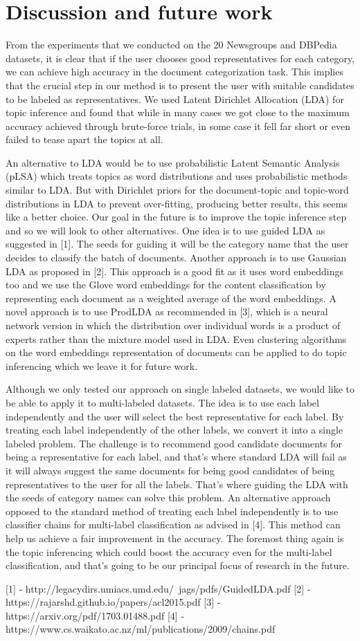 \section{Discussion and future work}
From the experiments that we conducted on the 20 Newsgroups and DBPedia datasets, it is clear that if the user chooses good representatives for each category, we can achieve high accuracy in the document categorization task. This implies that the crucial step in our method is to present the user with suitable candidates to be labeled as representatives.  We used Latent Dirichlet Allocation (LDA) for topic inference and found that while in many cases we got close to the maximum accuracy achieved through brute-force trials, in some case it fell far short or even failed to tease apart the topics at all.

An alternative to LDA would be to use probabilistic Latent Semantic Analysis (pLSA) which treats topics as word distributions and uses probabilistic methods similar to LDA. But with Dirichlet priors for the document-topic and topic-word distributions in LDA to prevent over-fitting, producing better results, this seems like a better choice. Our goal in the future is to improve the topic inference step and so we will look to other alternatives. One idea is to use guided LDA as suggested in [1].  The seeds for guiding it will be the category name that the user decides to classify the batch of documents.  Another approach is to use Gaussian LDA as proposed in [2].  This approach is a good fit as it uses word embeddings too and we use the Glove word embeddings for the content classification by representing each document as a weighted average of the word embeddings.  A novel approach is to use ProdLDA as recommended in [3], which is a neural network version in which the distribution over individual words is a product of experts rather than the mixture model used in LDA.  Even clustering algorithms on the word embeddings representation of documents can be applied to do topic inferencing which we leave it for future work.

Although we only tested our approach on single labeled datasets, we would like to be able to apply it to multi-labeled datasets. The idea is to use each label independently and the user will select the best representative for each label. By treating each label independently of the other labels, we convert it into a single labeled problem. The challenge is to recommend good candidate documents for being a representative for each label, and that's where standard LDA will fail as it will always suggest the same documents for being good candidates of being representatives to the user for all the labels.  That's where guiding the LDA with the seeds of category names can solve this problem.  An alternative approach opposed to the standard method of treating each label independently is to use classifier chains for multi-label classification as advised in [4].  This method can help us achieve a fair improvement in the accuracy.  The foremost thing again is the topic inferencing which could boost the accuracy even for the multi-label classification, and that's going to be our principal focus of research in the future.

[1] - http://legacydirs.umiacs.umd.edu/~jags/pdfs/GuidedLDA.pdf
[2] - https://rajarshd.github.io/papers/acl2015.pdf
[3] - https://arxiv.org/pdf/1703.01488.pdf
[4] - https://www.cs.waikato.ac.nz/ml/publications/2009/chains.pdf
